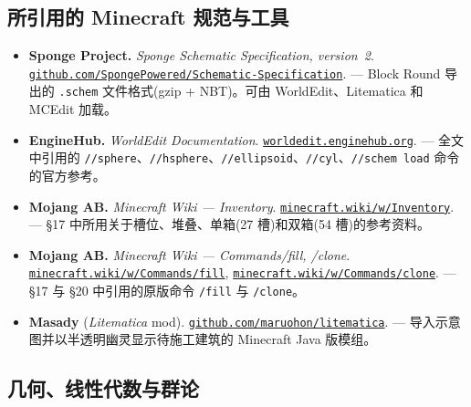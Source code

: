 \documentclass[12pt,a4paper]{scrartcl}
\newcommand{\code}[1]{\texttt{\small #1}}
\newcommand{\cmd}[1]{\textcolor{earth}{\texttt{\small #1}}}
\newcommand{\biblink}[2]{\href{#1}{\nolinkurl{#2}}}
\begin{document}
\subsection*{所引用的 Minecraft 规范与工具}

\begin{itemize}[leftmargin=1.4em,itemsep=0.3em,topsep=0.3em]
  \item \textbf{Sponge Project.} \emph{Sponge Schematic Specification, version~2}.
        \biblink{https://github.com/SpongePowered/Schematic-Specification}{github.com/SpongePowered/Schematic-Specification}.
        --- Block Round 导出的 \code{.schem} 文件格式(gzip + NBT)。可由 WorldEdit、Litematica 和 MCEdit 加载。

  \item \textbf{EngineHub.} \emph{WorldEdit Documentation}.
        \biblink{https://worldedit.enginehub.org/}{worldedit.enginehub.org}.
        --- 全文中引用的 \cmd{//sphere}、\cmd{//hsphere}、\cmd{//ellipsoid}、\cmd{//cyl}、\cmd{//schem load} 命令的官方参考。

  \item \textbf{Mojang AB.} \emph{Minecraft Wiki --- Inventory}.
        \biblink{https://minecraft.wiki/w/Inventory}{minecraft.wiki/w/Inventory}.
        --- §17 中所用关于槽位、堆叠、单箱(27 槽)和双箱(54 槽)的参考资料。

  \item \textbf{Mojang AB.} \emph{Minecraft Wiki --- Commands/fill, /clone}.
        \biblink{https://minecraft.wiki/w/Commands/fill}{minecraft.wiki/w/Commands/fill},
        \biblink{https://minecraft.wiki/w/Commands/clone}{minecraft.wiki/w/Commands/clone}.
        --- §17 与 §20 中引用的原版命令 \cmd{/fill} 与 \cmd{/clone}。

  \item \textbf{Masady} (\emph{Litematica} mod).
        \biblink{https://github.com/maruohon/litematica}{github.com/maruohon/litematica}.
        --- 导入示意图并以半透明幽灵显示待施工建筑的 Minecraft Java 版模组。
\end{itemize}

\subsection*{几何、线性代数与群论}
\end{document}

